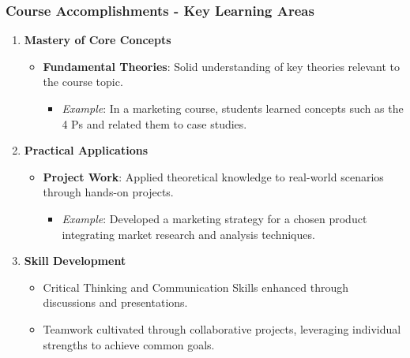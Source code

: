 \documentclass[aspectratio=169]{beamer}
\begin{document}
\begin{frame}[fragile]
    \frametitle{Course Accomplishments - Key Learning Areas}
    \begin{enumerate}
        \item \textbf{Mastery of Core Concepts}
            \begin{itemize}
                \item \textbf{Fundamental Theories}: Solid understanding of key theories relevant to the course topic. 
                    \begin{itemize}
                        \item \textit{Example}: In a marketing course, students learned concepts such as the 4 Ps and related them to case studies.
                    \end{itemize}
            \end{itemize}
        
        \item \textbf{Practical Applications}
            \begin{itemize}
                \item \textbf{Project Work}: Applied theoretical knowledge to real-world scenarios through hands-on projects.
                    \begin{itemize}
                        \item \textit{Example}: Developed a marketing strategy for a chosen product integrating market research and analysis techniques.
                    \end{itemize}
            \end{itemize}

        \item \textbf{Skill Development}
            \begin{itemize}
                \item Critical Thinking and Communication Skills enhanced through discussions and presentations.
                \item Teamwork cultivated through collaborative projects, leveraging individual strengths to achieve common goals.
            \end{itemize}
    \end{enumerate}
\end{frame}
\end{document}
